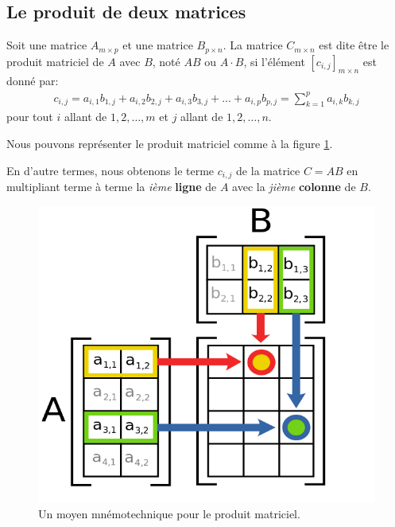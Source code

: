 \documentclass[]{book}
\theoremstyle{definition}
\theoremstyle{definition}
\theoremstyle{definition}
\theoremstyle{remark}
\let\BeginKnitrBlock\begin \let\EndKnitrBlock\end
\begin{document}
\hypertarget{le-produit-de-deux-matrices}{%
\subsection{Le produit de deux matrices}\label{le-produit-de-deux-matrices}}

\BeginKnitrBlock{definition}
\protect\hypertarget{def:unnamed-chunk-60}{}{\label{def:unnamed-chunk-60} }Soit une matrice \(A_{m\times p}\) et une matrice \(B_{p\times n}\). La matrice \(C_{m\times n}\) est dite être le produit matriciel de \(A\) avec \(B\), noté \(AB\) ou \(A\cdot B\), si l'élément \([c_{i,j}]_{m\times n}\) est donné par:
\begin{align*}
c_{i,j}=a_{i,1}b_{1,j}+a_{i,2}b_{2,j}+a_{i,3}b_{3,j}+...+a_{i,p}b_{p,j}=\sum_{k=1}^pa_{i,k}b_{k,j}
\end{align*}
pour tout \(i\) allant de \(1,2, \ldots , m\) et \(j\) allant de \(1,2,\ldots , n\).

Nous pouvons représenter le produit matriciel comme à la figure \ref{fig:matrix-multiplication}.

En d'autre termes, nous obtenons le terme \(c_{i,j}\) de la matrice \(C=AB\) en multipliant terme à terme la \emph{ième} \textbf{ligne} de \(A\) avec la \emph{jième} \textbf{colonne} de \(B\).
\EndKnitrBlock{definition}

\begin{figure}

{\centering \includegraphics[width=8.69in]{resources/images/Depection-of-Matrix-Multiplication} 

}

\caption{Un moyen mnémotechnique pour le produit matriciel.}\label{fig:matrix-multiplication}
\end{figure}
\end{document}
